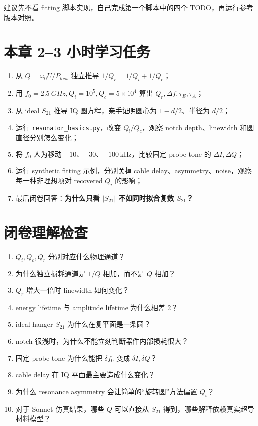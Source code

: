 \documentclass[11pt,a4paper,openany]{ctexrep}
\begin{document}
建议先不看 fitting 脚本实现，自己完成第一个脚本中的四个 TODO，再运行参考版本对照。

\section{本章 2--3 小时学习任务}

\begin{enumerate}
  \item 从 $Q=\omega_0U/P_{loss}$ 独立推导 $1/Q_r=1/Q_i+1/Q_c$；
  \item 用 $f_0=\SI{2.5}{GHz},Q_i=10^5,Q_c=5\times10^4$ 算出 $Q_r,\Delta f,\tau_E,\tau_A$；
  \item 从 ideal $S_{21}$ 推导 IQ 圆方程，亲手证明圆心为 $1-d/2$、半径为 $d/2$；
  \item 运行 \texttt{resonator\_basics.py}，改变 $Q_i/Q_c$，观察 notch depth、linewidth 和圆直径分别怎么变化；
  \item 将 $f_0$ 人为移动 $-10$、$-30$、$-100\,\mathrm{kHz}$，比较固定 probe tone 的 $\Delta I,\Delta Q$；
  \item 运行 synthetic fitting 示例，分别关掉 cable delay、asymmetry、noise，观察每一种非理想项对 recovered $Q_i$ 的影响；
  \item 最后闭卷回答：\textbf{为什么只看 $|S_{21}|$ 不如同时拟合复数 $S_{21}$？}
\end{enumerate}

\section{闭卷理解检查}

\begin{checkpointbox}
\begin{enumerate}
  \item $Q_i,Q_c,Q_r$ 分别对应什么物理通道？
  \item 为什么独立损耗通道是 $1/Q$ 相加，而不是 $Q$ 相加？
  \item $Q_r$ 增大一倍时 linewidth 如何变化？
  \item energy lifetime 与 amplitude lifetime 为什么相差 2？
  \item ideal hanger $S_{21}$ 为什么在复平面是一条圆？
  \item notch 很浅时，为什么不能立刻判断器件内部损耗很大？
  \item 固定 probe tone 为什么能把 $\delta f_0$ 变成 $\delta I,\delta Q$？
  \item cable delay 在 IQ 平面最主要造成什么变化？
  \item 为什么 resonance asymmetry 会让简单的“旋转圆”方法偏置 $Q_i$？
  \item 对于 Sonnet 仿真结果，哪些 $Q$ 可以直接从 $S_{21}$ 得到，哪些解释依赖真实超导材料模型？
\end{enumerate}
\end{checkpointbox}
\end{document}
